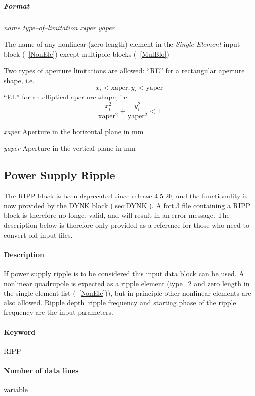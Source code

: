 \documentclass[a4paper,11pt]{report}
\begin{document}
\subparagraph{Format} {\em name type--of--limitation xaper yaper}

\begin{description}
\item [name] The name of any nonlinear (zero length) element in the
  {\em Single Element} \/input block (~\ref{NonEle}) except multipole
  blocks (~\ref{MulBlo}).
\item [type--of--limitation] Two types of aperture limitations are
  allowed: \newline ``RE'' for a rectangular aperture shape, i.e.\ 
  $$
  x_{i} < \mathrm{xaper}, y_{i} < \mathrm{yaper}
  $$
  ``EL'' for an elliptical aperture shape, i.e.\ 
  $$
  \frac{x_{i}^{2}}{\mathrm{xaper}^{2}} + \frac{y_{i}^{2}}
  {\mathrm{yaper}^{2}} < 1
  $$
\item {\em xaper} \/Aperture in the horizontal plane in mm
\item {\em yaper} \/Aperture in the vertical plane in mm
\end{description}

\subsection{Power Supply Ripple} \label{PowRip}

The RIPP block is been deprecated since release 4.5.20, and the functionality is now provided by the DYNK block (\ref{sec:DYNK}).
A fort.3 file containing a RIPP block is therefore no longer valid, and will result in an error message.
The description below is therefore only provided as a reference for those who need to convert old input files.

\paragraph{Description} If power supply ripple is to be considered
this input data block can be used. A nonlinear quadrupole is expected
as a ripple element (type=2 and zero length in the single element list
(~\ref{NonEle})), but in principle other nonlinear elements are also
allowed.  Ripple depth, ripple frequency and starting phase of the
ripple frequency are the input parameters.

\paragraph{Keyword} RIPP

\paragraph{Number of data lines} variable
\end{document}
